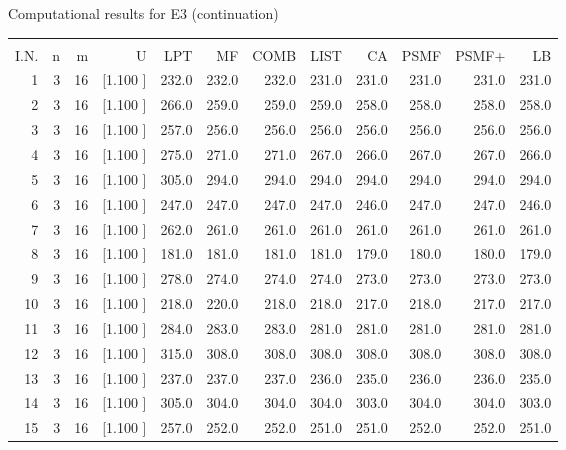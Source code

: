 \documentclass[12pt,a4paper]{article}
\begin{document}
\newpage
\begin{center}
 Computational results for E3 (continuation) {\tiny
\begin{tabular}{r r r r r r r r r r r r}\hline
    &   &   &          &        &        &        &        &        &        &        &       \\[-0.1in]
  I.N.  &  n  &  m  &  U  &  LPT  &  MF  &  COMB  &  LIST  &  CA  & PSMF &PSMF+ & LB \\[0.03in]
\hline
   1&  3& 16&[1.100     ]&   232.0&   232.0&   232.0&   231.0&   231.0&   231.0&   231.0&   231.0\\[-0.02in]
   2&  3& 16&[1.100     ]&   266.0&   259.0&   259.0&   259.0&   258.0&   258.0&   258.0&   258.0\\[-0.02in]
   3&  3& 16&[1.100     ]&   257.0&   256.0&   256.0&   256.0&   256.0&   256.0&   256.0&   256.0\\[-0.02in]
   4&  3& 16&[1.100     ]&   275.0&   271.0&   271.0&   267.0&   266.0&   267.0&   267.0&   266.0\\[-0.02in]
   5&  3& 16&[1.100     ]&   305.0&   294.0&   294.0&   294.0&   294.0&   294.0&   294.0&   294.0\\[-0.02in]
   6&  3& 16&[1.100     ]&   247.0&   247.0&   247.0&   247.0&   246.0&   247.0&   247.0&   246.0\\[-0.02in]
   7&  3& 16&[1.100     ]&   262.0&   261.0&   261.0&   261.0&   261.0&   261.0&   261.0&   261.0\\[-0.02in]
   8&  3& 16&[1.100     ]&   181.0&   181.0&   181.0&   181.0&   179.0&   180.0&   180.0&   179.0\\[-0.02in]
   9&  3& 16&[1.100     ]&   278.0&   274.0&   274.0&   274.0&   273.0&   273.0&   273.0&   273.0\\[-0.02in]
  10&  3& 16&[1.100     ]&   218.0&   220.0&   218.0&   218.0&   217.0&   218.0&   217.0&   217.0\\[-0.02in]
  11&  3& 16&[1.100     ]&   284.0&   283.0&   283.0&   281.0&   281.0&   281.0&   281.0&   281.0\\[-0.02in]
  12&  3& 16&[1.100     ]&   315.0&   308.0&   308.0&   308.0&   308.0&   308.0&   308.0&   308.0\\[-0.02in]
  13&  3& 16&[1.100     ]&   237.0&   237.0&   237.0&   236.0&   235.0&   236.0&   236.0&   235.0\\[-0.02in]
  14&  3& 16&[1.100     ]&   305.0&   304.0&   304.0&   304.0&   303.0&   304.0&   304.0&   303.0\\[-0.02in]
  15&  3& 16&[1.100     ]&   257.0&   252.0&   252.0&   251.0&   251.0&   252.0&   252.0&   251.0\\[-0.02in]

\end{tabular}}
\end{center}
\end{document}
